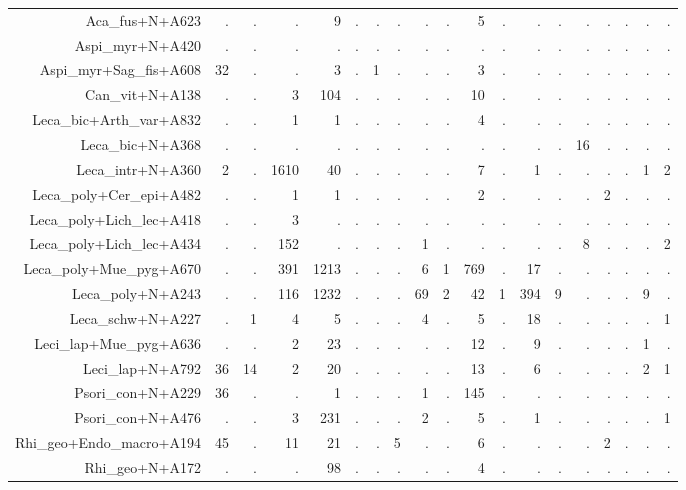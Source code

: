 \documentclass[a4paper, 11]{article}\usepackage[]{graphicx}\usepackage[]{color}
\begin{document}
\begin{table}
\begin{tabular}{rrrrrrrrrrrrrrrrrrr}
  \hline
Aca\_fus+N+A623 & . & . & . & 9 & . & . & . & . & . & 5 & . & . & . & . & . & . & . & . \\ 
  Aspi\_myr+N+A420 & . & . & . & . & . & . & . & . & . & . & . & . & . & . & . & . & . & . \\ 
  Aspi\_myr+Sag\_fis+A608 & 32 & . & . & 3 & . & 1 & . & . & . & 3 & . & . & . & . & . & . & . & . \\ 
  Can\_vit+N+A138 & . & . & 3 & 104 & . & . & . & . & . & 10 & . & . & . & . & . & . & . & . \\ 
  Leca\_bic+Arth\_var+A832 & . & . & 1 & 1 & . & . & . & . & . & 4 & . & . & . & . & . & . & . & . \\ 
  Leca\_bic+N+A368 & . & . & . & . & . & . & . & . & . & . & . & . & . & 16 & . & . & . & . \\ 
  Leca\_intr+N+A360 & 2 & . & 1610 & 40 & . & . & . & . & . & 7 & . & 1 & . & . & . & . & 1 & 2 \\ 
  Leca\_poly+Cer\_epi+A482 & . & . & 1 & 1 & . & . & . & . & . & 2 & . & . & . & . & 2 & . & . & . \\ 
  Leca\_poly+Lich\_lec+A418 & . & . & 3 & . & . & . & . & . & . & . & . & . & . & . & . & . & . & . \\ 
  Leca\_poly+Lich\_lec+A434 & . & . & 152 & . & . & . & . & 1 & . & . & . & . & . & 8 & . & . & . & 2 \\ 
  Leca\_poly+Mue\_pyg+A670 & . & . & 391 & 1213 & . & . & . & 6 & 1 & 769 & . & 17 & . & . & . & . & . & . \\ 
  Leca\_poly+N+A243 & . & . & 116 & 1232 & . & . & . & 69 & 2 & 42 & 1 & 394 & 9 & . & . & . & 9 & . \\ 
  Leca\_schw+N+A227 & . & 1 & 4 & 5 & . & . & . & 4 & . & 5 & . & 18 & . & . & . & . & . & 1 \\ 
  Leci\_lap+Mue\_pyg+A636 & . & . & 2 & 23 & . & . & . & . & . & 12 & . & 9 & . & . & . & . & 1 & . \\ 
  Leci\_lap+N+A792 & 36 & 14 & 2 & 20 & . & . & . & . & . & 13 & . & 6 & . & . & . & . & 2 & 1 \\ 
  Psori\_con+N+A229 & 36 & . & . & 1 & . & . & . & 1 & . & 145 & . & . & . & . & . & . & . & . \\ 
  Psori\_con+N+A476 & . & . & 3 & 231 & . & . & . & 2 & . & 5 & . & 1 & . & . & . & . & . & 1 \\ 
  Rhi\_geo+Endo\_macro+A194 & 45 & . & 11 & 21 & . & . & 5 & . & . & 6 & . & . & . & . & 2 & . & . & . \\ 
  Rhi\_geo+N+A172 & . & . & . & 98 & . & . & . & . & . & 4 & . & . & . & . & . & . & . & . \\ 

\end{tabular}
\end{table}
\end{document}
